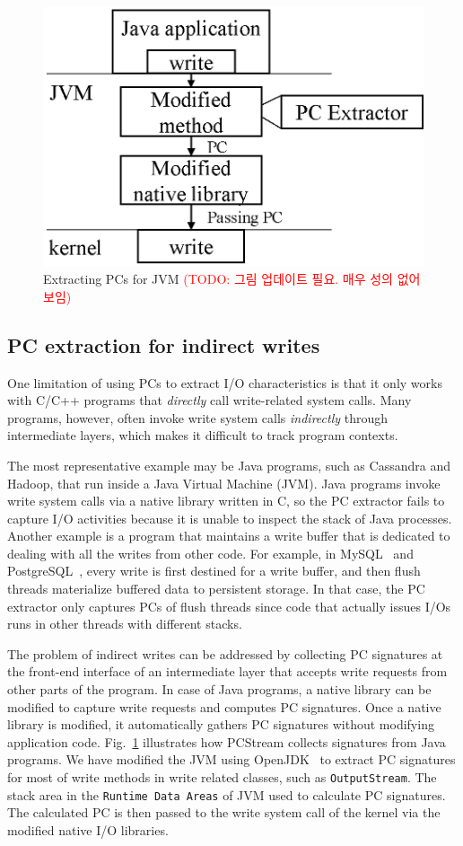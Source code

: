 \begin{figure}[t]
\centering
	\includegraphics[width=0.6\linewidth]{figure/jvmpc}
	\caption{
	Extracting PCs for JVM \textcolor{red}{(TODO: 그림 업데이트 필요. 매우 성의
	없어 보임)} 
	}
\label{fig:java}
\end{figure}


\subsection{PC extraction for indirect writes}
One limitation of using PCs to extract I/O characteristics is that it only
works with C/C++ programs that \textit{directly} call write-related system
calls.  Many programs, however, often invoke write system calls
\textit{indirectly} through intermediate layers, which makes it difficult to
track program contexts.

The most representative example may be Java programs, such as Cassandra and
Hadoop, that run inside a Java Virtual Machine (JVM). Java programs invoke
write system calls via a native library written in C, so the PC extractor fails
to capture I/O activities because it is unable to inspect the stack of Java
processes.  Another example is a program that maintains a write buffer that is
dedicated to dealing with all the writes from other code. For example, in
MySQL~\cite{MySQL} and PostgreSQL~\cite{PostgreSQL}, every write is first
destined for a write buffer, and then flush threads materialize buffered data
to persistent storage.  In that case, the PC extractor only captures PCs of
flush threads since code that actually issues I/Os runs in other threads with
different stacks.

The problem of indirect writes can be addressed by collecting PC signatures at
the front-end interface of an intermediate layer that accepts write requests
from other parts of the program. In case of Java programs, a native library can
be modified to capture write requests and computes PC signatures. Once a native
library is modified, it automatically gathers PC signatures without modifying
application code. Fig.~\ref{fig:java} illustrates how \textsf{PCStream}
collects signatures from Java programs.  We have modified the JVM using
OpenJDK~\cite{OpenJDK} to extract PC signatures for most of write methods in
write related classes, such as \texttt{OutputStream}.  The stack area in the
\texttt{Runtime Data Areas} of JVM used to calculate PC signatures.  The
calculated PC is then passed to the write system call of the kernel via the
modified native I/O libraries.

